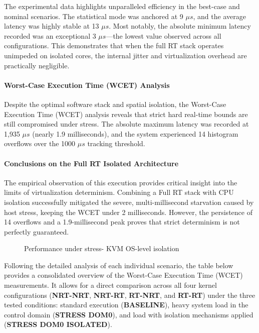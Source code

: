 The experimental data highlights unparalleled efficiency in the
best-case and nominal scenarios. The statistical mode was anchored at 9
$\mu s$, and the average latency was highly stable at 13 $\mu s$. Most notably,
the absolute minimum latency recorded was an exceptional 3 $\mu s$---the
lowest value observed across all configurations. This demonstrates that
when the full RT stack operates unimpeded on isolated cores, the
internal jitter and virtualization overhead are practically negligible.

\paragraph{Worst-Case Execution Time (WCET)
Analysis}\label{worst-case-execution-time-wcet-analysis-8}

Despite the optimal software stack and spatial isolation, the Worst-Case
Execution Time (WCET) analysis reveals that strict hard real-time bounds
are still compromised under stress. The absolute maximum latency was
recorded at 1,935 $\mu s$ (nearly 1.9 milliseconds), and the system
experienced 14 histogram overflows over the 1000 $\mu s$ tracking threshold.

\paragraph{Conclusions on the Full RT Isolated
Architecture}\label{conclusions-on-the-full-rt-isolated-architecture}

The empirical observation of this execution provides critical insight
into the limits of virtualization determinism. Combining a Full RT stack
with CPU isolation successfully mitigated the severe, multi-millisecond
starvation caused by host stress, keeping the WCET under 2 milliseconds.
However, the persistence of 14 overflows and a 1.9-millisecond peak
proves that strict determinism is not perfectly guaranteed.

\begin{figure}
\centering

\caption{Performance under stress- KVM OS-level isolation}
\end{figure}


Following the detailed analysis of each individual scenario, the table
below provides a consolidated overview of the Worst-Case Execution Time
(WCET) measurements. It allows for a direct comparison across all four
kernel configurations (\textbf{NRT-NRT}, \textbf{NRT-RT},
\textbf{RT-NRT}, and \textbf{RT-RT}) under the three tested conditions:
standard execution (\textbf{BASELINE}), heavy system load in the control
domain (\textbf{STRESS DOM0}), and load with isolation mechanisms
applied (\textbf{STRESS DOM0 ISOLATED}).

